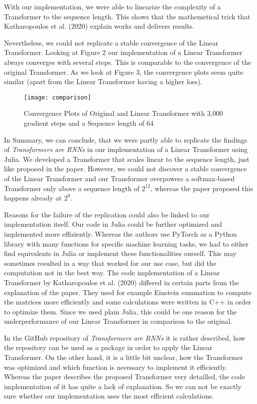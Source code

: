 \documentclass[DIV=13,fontsize=11pt]{scrartcl}
\begin{document}
With our implementation, we were able to linearize the complexity of a Transformer to the sequence length. This shows that the mathemetical trick that Katharopoulos et al. (2020) explain works and delivers results. 

Nevertheless, we could not replicate a stable convergence of the Linear Transformer. Looking at Figure 2 our implementation of a Linear Transformer always converges with several steps. This is comparable to the convergence of the original Transformer. As we look at Figure 3, the convergence plots seem quite similar (apart from the Linear Transformer having a higher loss).

\begin{figure}[h]
    \centering
    \texttt{[image: comparison]}
    \caption{Convergence Plots of Original and Linear Transformer with 3,000 gradient steps and a Sequence length of 64}
    \label{fig:mesh1}
\end{figure}

In Summary, we can conclude, that we were partly able to replicate the findings of  \textit{Transformers are RNNs} in our implementation of a Linear Transformer using Julia. We developed a Transformer that scales linear to the sequence length, just like proposed in the paper. However, we could not discover a stable convergence of the Linear Transformer and our Transformer overpowers a softmax-based Transformer only above a sequence length of \(2^{12}\),  whereas the paper proposed this happens already at \(2^{9}\). 

Reasons for the failure of the replication could also be linked to our implementation itself. Our code in Julia could be further optimized and implemented more effiziently. Whereas the authors use PyTorch as a Python library with many functions for specific machine learning tasks, we had to either find equivalents in Julia or implement these functionalities ourself. This may sometimes resulted in a way that worked for our use case, but did the computation not in the best way. The code implementation of a Linear Transformer by Katharopoulos et al. (2020) differed in certain parts from the explanation of the paper. They used for example Einstein summation to compute the matrices more efficiently and some calculations were written in C++ in order to optimize them. Since we used plain Julia, this could be one reason for the underperformance of our Linear Transformer in comparison to the original. 

In the GitHub repository of \textit{Transformers are RNNs} it is rather described, how the repository can be used as a package in order to apply the Linear Transformer. On the other hand, it is a little bit unclear, how the Transformer was optimized and which function is necessary to implement it efficiently. Whereas the paper describes the proposed Transformer very detailled, the code implementation of it has quite a lack of explanation.  So we can not be exactly sure whether our implementation uses the most efficient calculations.
\end{document}
